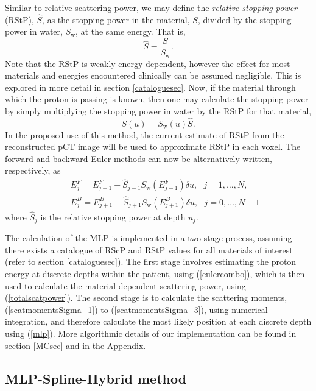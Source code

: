 \documentclass[preprint,times]{elsarticle}
\begin{document}
Similar to relative scattering power, we may define the \emph{relative stopping power} (RStP), $\hat{S}$, as the stopping power in the material, $S$, divided by the stopping power in water, $S_\mathrm{w}$, at the same energy. That is,
\begin{equation}
\hat{S} = \frac{S}{S_\mathrm{w}}. \label{relstoppingpower}
\end{equation}
Note that the RStP is weakly energy dependent, however the effect for most materials and energies encountered clinically can be assumed negligible. This is explored in more detail in section \ref{cataloguesec}. Now, if the material through which the proton is passing is known, then one may calculate the stopping power by simply multiplying the stopping power in water by the RStP for that material,
\begin{equation}
S(u) = S_\mathrm{w}(u)\hat{S}. \label{totalstoppower}
\end{equation}
In the proposed use of this method, the current estimate of RStP from the reconstructed pCT image will be used to approximate RStP in each voxel. The forward and backward Euler methods can now be alternatively written, respectively, as
\begin{eqnarray}
&& E_j^F = E_{j-1}^F - \hat{S}_{j-1}S_\mathrm{w}(E_{j-1}^F)\delta u, \ \ \ j=1,\dots,N, \label{eulerforward2} \\
&& E_j^B = E_{j+1}^B + \hat{S}_{j+1}S_\mathrm{w}(E_{j+1}^B)\delta u, \ \ \ j=0,\dots,N-1 \label{eulerbackward2}
\end{eqnarray}
where $\hat{S}_j$ is the relative stopping power at depth $u_j$.

The calculation of the MLP is implemented in a two-stage process, assuming there exists a catalogue of RScP and RStP values for all materials of interest (refer to section \ref{cataloguesec}). The first stage involves estimating the proton energy at discrete depths within the patient, using (\ref{eulercombo}), which is then used to calculate the material-dependent scattering power, using (\ref{totalscatpower}). The second stage is to calculate the scattering moments, (\ref{scatmomentsSigma_1}) to (\ref{scatmomentsSigma_3}), using numerical integration, and therefore calculate the most likely position at each discrete depth using (\ref{mlp}). More algorithmic details of our implementation can be found in section \ref{MCsec} and in the Appendix.

\subsection{MLP-Spline-Hybrid method}
\end{document}
